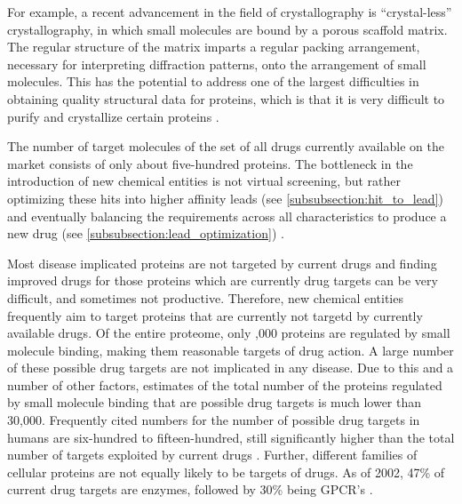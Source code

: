 For example, a recent advancement in the field of crystallography is ``crystal-less'' crystallography, in which small molecules are bound by a porous scaffold matrix.
The regular structure of the matrix imparts a regular packing arrangement, necessary for interpreting diffraction patterns, onto the arrangement of small molecules.
This has the potential to address one of the largest difficulties in obtaining quality structural data for proteins, which is that it is very difficult to purify and crystallize certain proteins \cite{inokuma2013x}.

The number of target molecules of the set of all drugs currently available on the market consists of only about five-hundred proteins.
The bottleneck in the introduction of new chemical entities is not virtual screening, but rather optimizing these hits into higher affinity leads (see \ref{subsubsection:hit_to_lead}) and eventually balancing the requirements across all characteristics to produce a new drug (see \ref{subsubsection:lead_optimization}) \cite{bleicher2003hit}.

Most disease implicated proteins are not targeted by current drugs and finding improved drugs for those proteins which are currently drug targets can be very difficult, and sometimes not productive. 
Therefore, new chemical entities frequently aim to target proteins that are currently not targetd by currently available drugs. 
Of the entire proteome, only ,000 proteins are regulated by small molecule binding, making them reasonable targets of drug action.
A large number of these possible drug targets are not implicated in any disease.
Due to this and a number of other factors, estimates of the total number of the proteins regulated by small molecule binding that are possible drug targets is much lower than 30,000.
Frequently cited numbers for the number of possible drug targets in humans are six-hundred to fifteen-hundred, still significantly higher than the total number of targets exploited by current drugs \cite{imming2006drugs,overington2006many}.
Further, different families of cellular proteins are not equally likely to be targets of drugs.
As of 2002, 47\% of current drug targets are enzymes, followed by 30\% being GPCR's \cite{hopkins2002druggable}.

